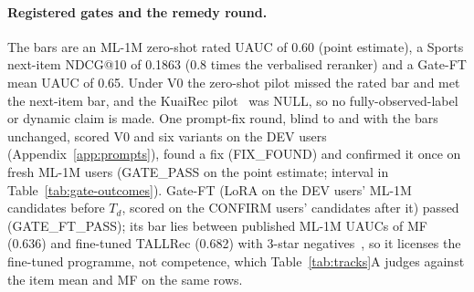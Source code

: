 \paragraph{Registered gates and the remedy round.}
The bars are an ML-1M zero-shot rated UAUC of 0.60 (point estimate), a Sports next-item NDCG@10 of 0.1863 (0.8 times the verbalised
reranker) and a Gate-FT mean UAUC of 0.65. Under V0 the zero-shot pilot missed the rated bar and met the next-item bar, and the KuaiRec
pilot~\citep{gao2022kuairec} was NULL, so no fully-observed-label or dynamic claim is made. One prompt-fix round, blind to \method{}
and with the bars unchanged, scored V0 and six variants on the DEV users (Appendix~\ref{app:prompts}), found a fix (FIX\_FOUND) and
confirmed it once on fresh ML-1M users (GATE\_PASS on the point estimate; interval in Table~\ref{tab:gate-outcomes}). Gate-FT (LoRA on
the DEV users' ML-1M candidates before $T_d$, scored on the CONFIRM users' candidates after it) passed (GATE\_FT\_PASS); its bar lies
between published ML-1M UAUCs of MF (0.636) and fine-tuned TALLRec (0.682) with 3-star negatives~\citep{zhang2025collm}, so it licenses
the fine-tuned programme, not competence, which Table~\ref{tab:tracks}A judges against the item mean and MF on the same rows.
\begin{table}[!htbp]
\caption{Registered gates of the remedy round and Gate-FT (DEV: 1,500 users per panel; CONFIRM: 1,683 fresh ML-1M
users, Gate-FT on their candidates after $T_d$; the pilot outcomes are in the text).}
\label{tab:gate-outcomes}
\centering\scriptsize\setlength{\tabcolsep}{3pt}\renewcommand{\arraystretch}{0.9}
\end{table}

